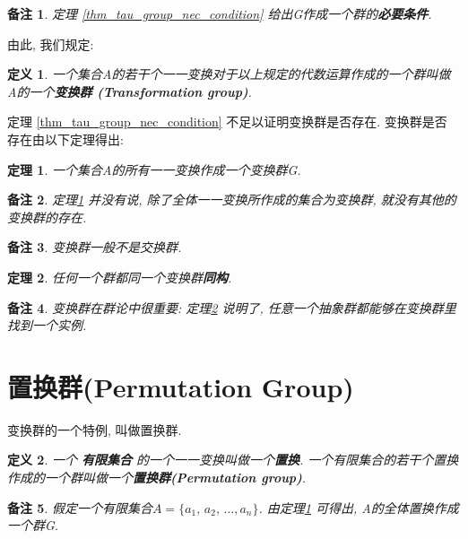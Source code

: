 \documentclass[utf8]{ctexbook}
\newtheorem{theorem}{定理}[section]
\newtheorem{definition}{定义}[section]
\newtheorem{memo}{备注}[section]
\begin{document}
\begin{memo}
 定理 \ref{thm_tau_group_nec_condition} 给出G作成一个群的\textbf{必要条件}.
\end{memo}

由此, 我们规定:
\begin{definition}\label{def_transformation_group}
一个集合A的若干个一一变换对于以上规定的代数运算作成的一个群叫做A的一个\textbf{变换群 (Transformation group)}.
\end{definition}

定理 \ref{thm_tau_group_nec_condition} 不足以证明变换群是否存在. 变换群是否存在由以下定理得出:

\begin{theorem}\label{thm_oneone_tau_group}
一个集合A的所有一一变换作成一个变换群G. 
\end{theorem}

\begin{memo}
定理\ref{thm_oneone_tau_group} 并没有说, 除了全体一一变换所作成的集合为变换群, 就没有其他的变换群的存在.
\end{memo}

\begin{memo}
变换群一般不是交换群. 
\end{memo}

\begin{theorem}\label{thm_all_groups_map_to_tau_group}
任何一个群都同一个变换群\textbf{同构}.
\end{theorem}
\begin{memo}
变换群在群论中很重要: 定理\ref{thm_all_groups_map_to_tau_group} 说明了, 任意一个抽象群都能够在变换群里找到一个实例.
\end{memo}


\section{置换群(Permutation Group)}

变换群的一个特例, 叫做置换群.

\begin{definition}\label{def_permutation_groups}
一个 \textbf{有限集合} 的一个一一变换叫做一个\textbf{置换}. 一个有限集合的若干个置换作成的一个群叫做一个\textbf{置换群(Permutation group)}.
\end{definition}

\begin{memo}
假定一个有限集合$A = \{a_1, \, a_2, \, \ldots, a_n \}$. 由定理\ref{thm_oneone_tau_group} 可得出, A的全体置换作成一个群G. 
\end{memo}
\end{document}
